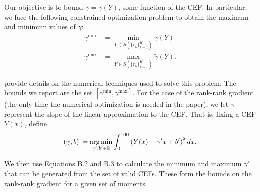 Our objective is to bound $\gamma = \gamma(Y)$, some function of the
CEF. In particular, we face the following constrained optimization problem to
obtain the maximum and minimum values of $\gamma$: 
\begin{align}
\gamma^{\text{min}} &= \min_{Y \in S\left(\{r_k \}_{k=1}^K \right) }
\tilde{\gamma}(Y) \\
\gamma^{\text{max}} &= \max_{Y \in S\left(\{r_k \}_{k=1}^K  \right) }
\tilde{\gamma}(Y). 
\end{align}

 provide details on the numerical techniques
used to solve this problem. The bounds we report are the set
$[\gamma^{\text{min}}, \gamma^{\text{max}}]$. For the case of the rank-rank gradient (the only time the numerical optimization is needed in the paper), we let $\gamma$ represent the
slope of the linear approximation to the CEF. That
is, fixing a CEF $Y(x)$, define 
$$(\gamma, b) \coloneqq \operatorname*{arg\,min}_{\gamma', b' \in \mathbb{R} } \int_0^{100} \left(Y(x) - \gamma'
  x + b'\right)^2 dx.$$ 

  We then use Equations B.2 and B.3 to calculate the minimum and maximum $\gamma'$ that can be generated from the set of valid CEFs. These form the bounds on the rank-rank gradient for a given set of moments.


